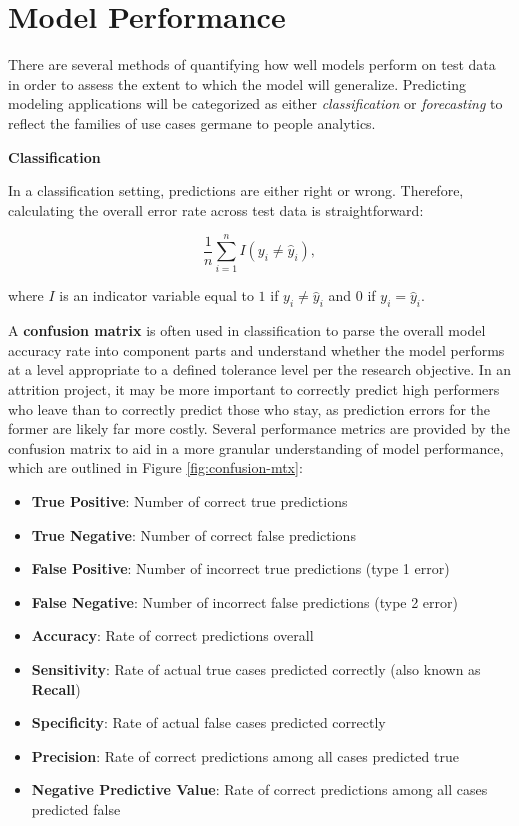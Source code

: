 \documentclass[
]{book}
\providecommand{\tightlist}{%
  \setlength{\itemsep}{0pt}\setlength{\parskip}{0pt}}
\begin{document}
\hypertarget{model-performance}{%
\section{Model Performance}\label{model-performance}}

There are several methods of quantifying how well models perform on test data in order to assess the extent to which the model will generalize. Predicting modeling applications will be categorized as either \emph{classification} or \emph{forecasting} to reflect the families of use cases germane to people analytics.

\textbf{Classification}

In a classification setting, predictions are either right or wrong. Therefore, calculating the overall error rate across test data is straightforward:

\[ \frac{1}{n} \displaystyle\sum_{i=1}^{n} I(y_i \ne \hat y_i), \]

where \(I\) is an indicator variable equal to \(1\) if \(y_i \ne \hat y_i\) and \(0\) if \(y_i = \hat y_i\).

A \textbf{confusion matrix} is often used in classification to parse the overall model accuracy rate into component parts and understand whether the model performs at a level appropriate to a defined tolerance level per the research objective. In an attrition project, it may be more important to correctly predict high performers who leave than to correctly predict those who stay, as prediction errors for the former are likely far more costly. Several performance metrics are provided by the confusion matrix to aid in a more granular understanding of model performance, which are outlined in Figure \ref{fig:confusion-mtx}:

\begin{itemize}
\tightlist
\item
  \textbf{True Positive}: Number of correct true predictions
\item
  \textbf{True Negative}: Number of correct false predictions
\item
  \textbf{False Positive}: Number of incorrect true predictions (type 1 error)
\item
  \textbf{False Negative}: Number of incorrect false predictions (type 2 error)
\item
  \textbf{Accuracy}: Rate of correct predictions overall
\item
  \textbf{Sensitivity}: Rate of actual true cases predicted correctly (also known as \textbf{Recall})
\item
  \textbf{Specificity}: Rate of actual false cases predicted correctly
\item
  \textbf{Precision}: Rate of correct predictions among all cases predicted true
\item
  \textbf{Negative Predictive Value}: Rate of correct predictions among all cases predicted false
\end{itemize}
\end{document}
